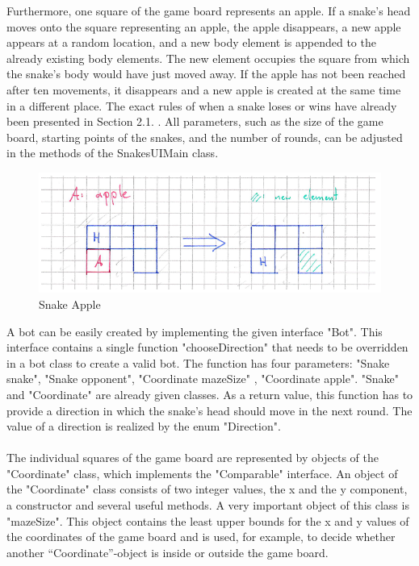 \documentclass[a4paper,12pt]{article}
\begin{document}
Furthermore, one square of the game board represents an apple. 
If a snake's head moves onto the square representing an apple, the apple disappears,
a new apple appears at a random location, and a new body element is appended to the already existing body elements. 
The new element occupies the square from which the snake's body would have just moved away. If the apple has not been reached 
after ten movements, it disappears and a new apple is created at the same time in a different place. The exact rules of when
a snake loses or wins have already been presented in Section 2.1.  . All parameters, such as the size of the game board,
starting points of the snakes, and the number of rounds, can be adjusted in the methods of the SnakesUIMain class.
 \begin{figure}[h]
    \centering
    \includegraphics[scale=0.8]{SnakeApple.png}
    \caption{Snake Apple}
\end{figure}
A bot can be easily created by implementing the given interface "Bot". This interface contains a single function 
"chooseDirection" that needs to be overridden in a bot class to create a valid bot. The function has four parameters:
"Snake snake", "Snake opponent", "Coordinate mazeSize" , "Coordinate apple". "Snake" and "Coordinate" are already given 
classes. As a return value, this function has to provide a direction in which the snake's head should move in the next round.
The value of a direction is realized by the enum "Direction".\\
\\The individual squares of the game board are represented by objects of the 
"Coordinate" class, which implements the "Comparable" interface. An object of the
"Coordinate" class consists of two integer values, the x and the y component, a constructor 
and several useful methods. A very important object of this class is "mazeSize". This object 
contains the least upper bounds for the x and y values of the coordinates of the game board and 
is used, for example, to decide whether another “Coordinate”-object is inside or outside the game board.
\end{document}
